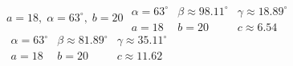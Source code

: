 { $a = 18, \; \alpha = 63^{\circ}, \; b = 20$ \label{ambigfirst} \label{anylawfirst}}
{ $\begin{array}{lll}\alpha = 63^{\circ} & \beta \approx 98.11^{\circ} & \gamma \approx 18.89^{\circ} \\a = 18 & b = 20 & c \approx 6.54 \end{array}$\\ $\begin{array}{lll}\alpha = 63^{\circ} & \beta \approx 81.89^{\circ} & \gamma \approx 35.11^{\circ} \\a = 18 & b = 20 & c \approx 11.62 \end{array}$}
